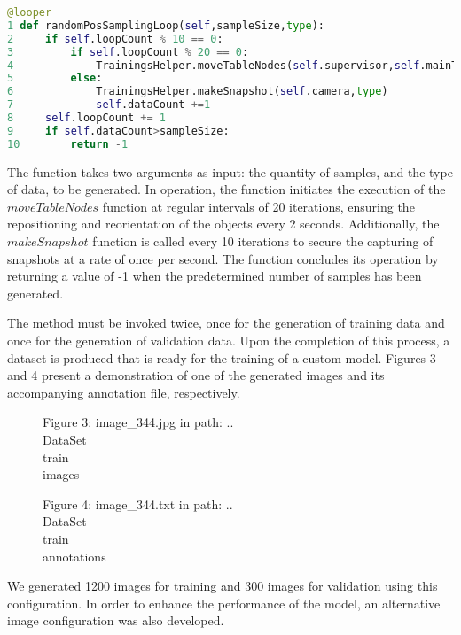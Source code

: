 \begin{lstlisting}[language=python]
@looper
1 def randomPosSamplingLoop(self,sampleSize,type):
2     if self.loopCount % 10 == 0:
3         if self.loopCount % 20 == 0:
4             TrainingsHelper.moveTableNodes(self.supervisor,self.mainTable)
5         else:
6             TrainingsHelper.makeSnapshot(self.camera,type)
7             self.dataCount +=1
8     self.loopCount += 1
9     if self.dataCount>sampleSize:
10        return -1
\end{lstlisting}
The function takes two arguments as input: the quantity of samples, and the type of data, to be generated. In operation, the function initiates the execution of the \(moveTableNodes\) function at regular intervals of 20 iterations, ensuring the repositioning and reorientation of the objects every 2 seconds. Additionally, the \(makeSnapshot\) function is called every 10 iterations to secure the capturing of snapshots at a rate of once per second. The function concludes its operation by returning a value of -1 when the predetermined number of samples has been generated.

The method must be invoked twice, once for the generation of training data and once for the generation of validation data. Upon the completion of this process, a dataset is produced that is ready for the training of a custom model. Figures 3 and 4 present a demonstration of one of the generated images and its accompanying annotation file, respectively.

\begin{figure}[!h]
    \centering
    \caption{Figure 3: image\_344.jpg in path: ..\\DataSet\\train\\images  }
\end{figure}

\begin{figure}[!h]
    \centering
    \caption{Figure 4: image\_344.txt in path: ..\\DataSet\\train\\annotations  }
\end{figure}

We generated 1200 images for training and 300 images for validation using this configuration. In order to enhance the performance of the model, an alternative image configuration was also developed.

